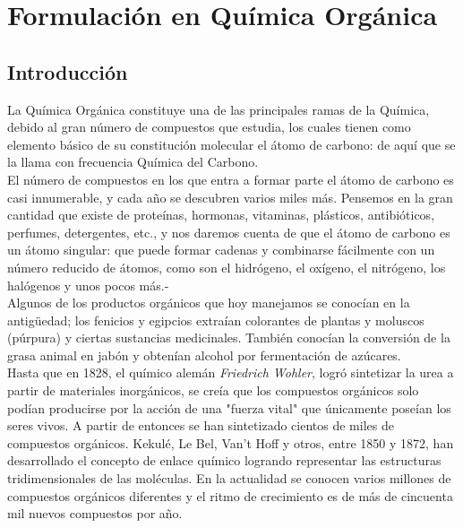 
\chapter{Formulación en Química Orgánica}

\section{Introducción}
La Química Orgánica constituye una de las principales ramas de la Química, debido al gran número de compuestos que estudia, los cuales tienen como elemento básico de su constitución molecular el átomo de carbono: de aquí que se la llama con frecuencia Química del Carbono.\\

El número de compuestos en los que entra a formar parte el átomo de carbono es casi innumerable, y cada año se descubren varios miles más. Pensemos en la gran cantidad que existe de proteínas, hormonas, vitaminas, plásticos, antibióticos, perfumes, detergentes, etc., y nos daremos cuenta de que el átomo de carbono es un átomo singular: que puede formar cadenas y combinarse fácilmente con un número reducido de átomos, como son el hidrógeno, el oxígeno, el nitrógeno, los halógenos y unos pocos más.-\\

Algunos de los productos orgánicos que hoy manejamos se conocían en la antigüedad; los fenicios y egipcios extraían colorantes de plantas y moluscos (púrpura) y ciertas sustancias medicinales. También conocían la conversión de la grasa animal en jabón y obtenían alcohol por fermentación de azúcares.\\ 

Hasta que en 1828, el químico alemán \emph{Friedrich Wohler}, logró sintetizar la urea a partir de materiales inorgánicos, se creía que los compuestos orgánicos solo podían producirse por la acción de una "fuerza vital" que únicamente poseían los seres vivos. A partir de entonces se han sintetizado cientos de miles de compuestos orgánicos. Kekulé, Le Bel, Van't Hoff y otros, entre 1850 y 1872, han desarrollado el concepto de enlace químico logrando representar las estructuras tridimensionales de las moléculas. En la actualidad se conocen varios millones de compuestos orgánicos diferentes y el ritmo de crecimiento es de más de cincuenta mil nuevos compuestos por año.

